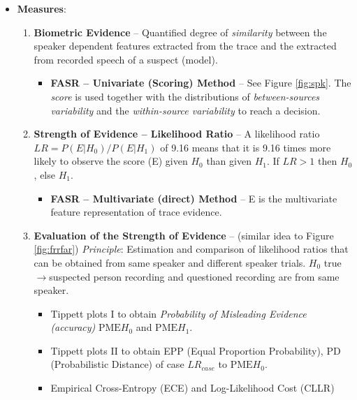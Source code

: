 \documentclass[a4paper]{article}
\begin{document}
\begin{itemize}
\begin{figure}[htp]
              \label{fig:byfs}
          \end{figure}
        \item \textbf{Measures}:
        \begin{enumerate}
          \item \textbf{Biometric Evidence} -- Quantified degree of \emph{similarity} between the speaker dependent features extracted from the trace and the extracted from recorded speech of a suspect (model).
          \begin{itemize}
            \item \textbf{FASR -- Univariate (Scoring) Method} -- See Figure \ref{fig:spk}. The \emph{score} is used together with the distributions of \emph{between-sources variability} and the \emph{within-source variability} to reach a decision.
          \end{itemize}
          \item \textbf{Strength of Evidence -- Likelihood Ratio} -- A likelihood ratio $LR=P(E|H_0)/P(E|H_1)$ of 9.16 means that it is 9.16 times more likely to observe the score (E) given $H_0$ than given $H_1$. If $LR>1$ then $H_0$, else $H_1$.
          \begin{itemize}
            \item \textbf{FASR -- Multivariate (direct) Method} -- E is the multivariate feature representation of trace evidence.
          \end{itemize}
          \item \textbf{Evaluation of the Strength of Evidence} -- (similar idea to Figure \ref{fig:frrfar}) \emph{Principle}: Estimation and comparison of likelihood ratios that can be obtained from same speaker and different speaker trials. $H_0$ true $\rightarrow$suspected person recording and questioned recording are from same speaker.
          \begin{itemize}
            \item Tippett plots I to obtain \emph{Probability of Misleading Evidence (accuracy)} $\text{PME}H_0$ and $\text{PME}H_1$.
            \item Tippett plots II to obtain EPP (Equal Proportion Probability), PD (Probabilistic Distance) of case $LR_{case}$ to $\text{PME}H_0$.
            \item Empirical Cross-Entropy (ECE) and Log-Likelihood Cost (CLLR) 
          \end{itemize}
        \end{enumerate}
      \end{itemize}
\end{document}
